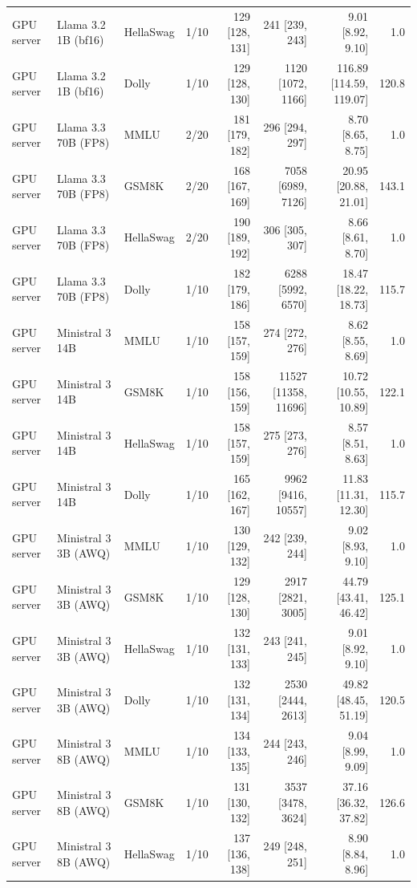 \begin{longtable}{@{}l l l c r r r r@{}}
GPU server & Llama 3.2 1B (bf16) & HellaSwag & 1/10 & 129 [128, 131] & 241 [239, 243] & 9.01 [8.92, 9.10] & 1.0 \\
GPU server & Llama 3.2 1B (bf16) & Dolly & 1/10 & 129 [128, 130] & 1120 [1072, 1166] & 116.89 [114.59, 119.07] & 120.8 \\
GPU server & Llama 3.3 70B (FP8) & MMLU & 2/20 & 181 [179, 182] & 296 [294, 297] & 8.70 [8.65, 8.75] & 1.0 \\
GPU server & Llama 3.3 70B (FP8) & GSM8K & 2/20 & 168 [167, 169] & 7058 [6989, 7126] & 20.95 [20.88, 21.01] & 143.1 \\
GPU server & Llama 3.3 70B (FP8) & HellaSwag & 2/20 & 190 [189, 192] & 306 [305, 307] & 8.66 [8.61, 8.70] & 1.0 \\
GPU server & Llama 3.3 70B (FP8) & Dolly & 1/10 & 182 [179, 186] & 6288 [5992, 6570] & 18.47 [18.22, 18.73] & 115.7 \\
GPU server & Ministral 3 14B & MMLU & 1/10 & 158 [157, 159] & 274 [272, 276] & 8.62 [8.55, 8.69] & 1.0 \\
GPU server & Ministral 3 14B & GSM8K & 1/10 & 158 [156, 159] & 11527 [11358, 11696] & 10.72 [10.55, 10.89] & 122.1 \\
GPU server & Ministral 3 14B & HellaSwag & 1/10 & 158 [157, 159] & 275 [273, 276] & 8.57 [8.51, 8.63] & 1.0 \\
GPU server & Ministral 3 14B & Dolly & 1/10 & 165 [162, 167] & 9962 [9416, 10557] & 11.83 [11.31, 12.30] & 115.7 \\
GPU server & Ministral 3 3B (AWQ) & MMLU & 1/10 & 130 [129, 132] & 242 [239, 244] & 9.02 [8.93, 9.10] & 1.0 \\
GPU server & Ministral 3 3B (AWQ) & GSM8K & 1/10 & 129 [128, 130] & 2917 [2821, 3005] & 44.79 [43.41, 46.42] & 125.1 \\
GPU server & Ministral 3 3B (AWQ) & HellaSwag & 1/10 & 132 [131, 133] & 243 [241, 245] & 9.01 [8.92, 9.10] & 1.0 \\
GPU server & Ministral 3 3B (AWQ) & Dolly & 1/10 & 132 [131, 134] & 2530 [2444, 2613] & 49.82 [48.45, 51.19] & 120.5 \\
GPU server & Ministral 3 8B (AWQ) & MMLU & 1/10 & 134 [133, 135] & 244 [243, 246] & 9.04 [8.99, 9.09] & 1.0 \\
GPU server & Ministral 3 8B (AWQ) & GSM8K & 1/10 & 131 [130, 132] & 3537 [3478, 3624] & 37.16 [36.32, 37.82] & 126.6 \\
GPU server & Ministral 3 8B (AWQ) & HellaSwag & 1/10 & 137 [136, 138] & 249 [248, 251] & 8.90 [8.84, 8.96] & 1.0 \\

\end{longtable}
